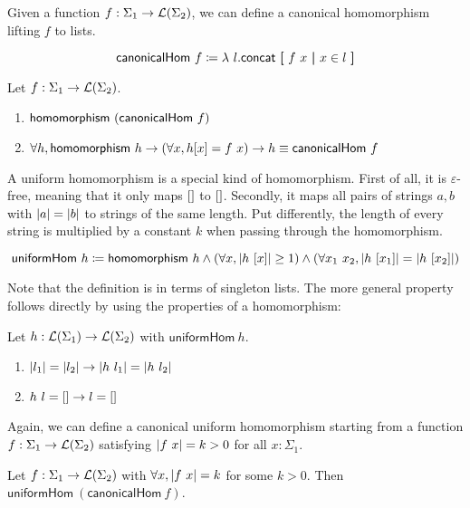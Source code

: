 Given a function $f : \Sigma_1 \rightarrow \mathcal{L} (\Sigma_2)$, we can define a canonical homomorphism lifting $f$ to lists.
\newcommand{\canonicalHom}{\textsf{canonicalHom}}
\begin{definition}
  \mnote{\canonicalHom}
  \[\canonicalHom~f \defeq \lambda~l. \rconcat~\withl f~x \withm x \in l \withr\]
\end{definition}

\begin{proposition}
  Let $f : \Sigma_1 \rightarrow \mathcal{L} (\Sigma_2)$. 
  \begin{enumerate}
    \item $\homomorphism~(\canonicalHom~f)$
    \item $\forall h, \homomorphism~h \rightarrow (\forall x, h [x] = f~x) \rightarrow h \equiv \canonicalHom~f$
  \end{enumerate}
\end{proposition}

A uniform homomorphism is a special kind of homomorphism. First of all, it is $\varepsilon$-free, meaning that it only maps $[]$ to $[]$. Secondly, it maps all pairs of strings $a, b$ with $|a| = |b|$ to strings of the same length. 
Put differently, the length of every string is multiplied by a constant $k$ when passing through the homomorphism. 

\newcommand{\uniformHomo}{\textsf{uniformHom}}
\begin{definition}
  \mnote{\uniformHomo}
  \[\uniformHomo~h \defeq \homomorphism~h \land (\forall x, \length{h~[x]} \ge 1) \land (\forall x_1~x_2, \length{h~[x_1]} = \length{h~[x_2]})\]
\end{definition}
Note that the definition is in terms of singleton lists. The more general property follows directly by using the properties of a homomorphism:
\begin{proposition}
  Let $h : \mathcal{L} (\Sigma_1) \rightarrow \mathcal{L} (\Sigma_2)$ with $\uniformHomo~h$.
  \begin{enumerate}
    \item $|l_1| = |l_2| \rightarrow |h~l_1| = |h~l_2|$
    \item $h~l = [] \rightarrow l = []$
  \end{enumerate}
\end{proposition}

Again, we can define a canonical uniform homomorphism starting from a function $f : \Sigma_1 \rightarrow \mathcal{L} (\Sigma_2)$ satisfying $|f~x| = k > 0$ for all $x : \Sigma_1$. 
\begin{proposition}
  Let $f : \Sigma_1 \rightarrow \mathcal{L} (\Sigma_2)$ with $\forall x, |f~x| = k$ for some $k > 0$. 
  Then $\uniformHomo~(\canonicalHom~f)$. 
\end{proposition}

